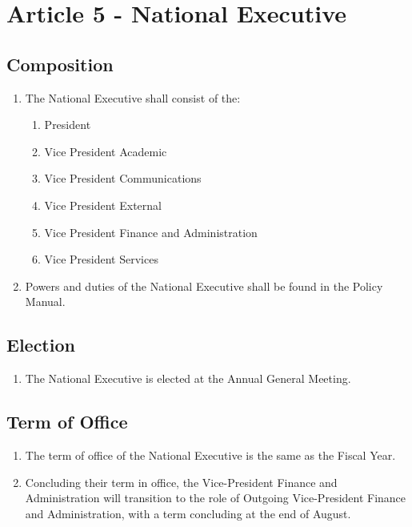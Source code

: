 \section{Article 5 - National Executive}
\label{article-5-national-executive}

\subsection{Composition}
\label{composition-national-executive}

\begin{enumerate}
 \item The National Executive shall consist of the:
  \begin{enumerate}
   \item President
   \item Vice President Academic
   \item Vice President Communications
   \item Vice President External
   \item Vice President Finance and Administration
   \item Vice President Services
  \end{enumerate}
 \item Powers and duties of the National Executive shall be found in the Policy Manual.
\end{enumerate}

\subsection{Election}
\label{election-national-executive}

\begin{enumerate}
 \item The National Executive is elected at the Annual General Meeting.
\end{enumerate}

\subsection{Term of Office}
\label{term-of-office}

\begin{enumerate}
 \item The term of office of the National Executive is the same as the Fiscal Year.
 \item Concluding their term in office, the Vice-President Finance and Administration will transition to the role of Outgoing Vice-President Finance and Administration, with a term concluding at the end of August.
\end{enumerate}
